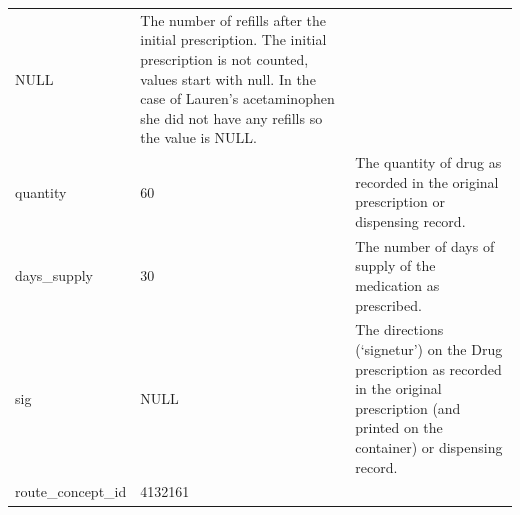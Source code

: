 \documentclass[11pt]{book}
\theoremstyle{definition}
\theoremstyle{definition}
\theoremstyle{definition}
\theoremstyle{remark}
\begin{document}
\begin{longtable}[]{@{}lll@{}}
\begin{minipage}[t]{0.15\columnwidth}
NULL\strut
\end{minipage} & \begin{minipage}[t]{0.49\columnwidth}\raggedright
The number of refills after the initial prescription. The initial prescription is not counted, values start with null. In the case of Lauren's acetaminophen she did not have any refills so the value is NULL.\strut
\end{minipage}\tabularnewline
\begin{minipage}[t]{0.28\columnwidth}\raggedright
quantity\strut
\end{minipage} & \begin{minipage}[t]{0.15\columnwidth}\raggedright
60\strut
\end{minipage} & \begin{minipage}[t]{0.49\columnwidth}\raggedright
The quantity of drug as recorded in the original prescription or dispensing record.\strut
\end{minipage}\tabularnewline
\begin{minipage}[t]{0.28\columnwidth}\raggedright
days\_supply\strut
\end{minipage} & \begin{minipage}[t]{0.15\columnwidth}\raggedright
30\strut
\end{minipage} & \begin{minipage}[t]{0.49\columnwidth}\raggedright
The number of days of supply of the medication as prescribed.\strut
\end{minipage}\tabularnewline
\begin{minipage}[t]{0.28\columnwidth}\raggedright
sig\strut
\end{minipage} & \begin{minipage}[t]{0.15\columnwidth}\raggedright
NULL\strut
\end{minipage} & \begin{minipage}[t]{0.49\columnwidth}\raggedright
The directions (`signetur') on the Drug prescription as recorded in the original prescription (and printed on the container) or dispensing record.\strut
\end{minipage}\tabularnewline
\begin{minipage}[t]{0.28\columnwidth}\raggedright
route\_concept\_id\strut
\end{minipage} & \begin{minipage}[t]{0.15\columnwidth}\raggedright
4132161\strut
\end{minipage} & \begin{minipage}[t]{0.49\columnwidth}\raggedright

\end{minipage}
\end{longtable}
\end{document}
